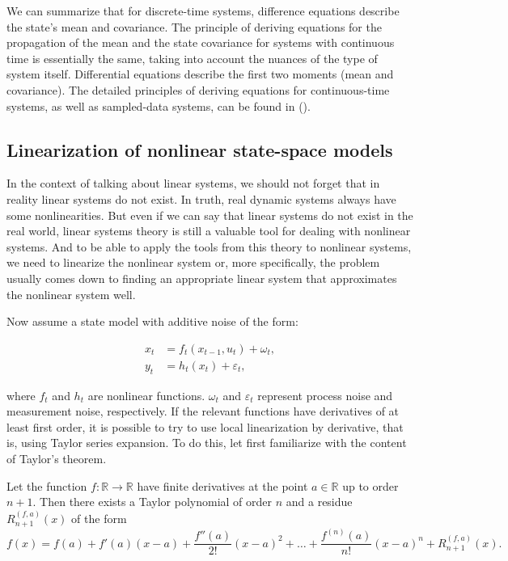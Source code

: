 We can summarize that for discrete-time systems, difference equations describe the state's mean and covariance. The principle of deriving equations for the propagation of the mean and the state covariance for systems with continuous time is essentially the same, taking into account the nuances of the type of system itself. Differential equations describe the first two moments (mean and covariance). The detailed principles of deriving equations for continuous-time systems, as well as sampled-data systems, can be found in (\cite[Chapter~4]{simon_optimal_2006}).

\subsection{Linearization of nonlinear state-space models} \label{lineariaztion_of_nonlinear_models}
In the context of talking about linear systems, we should not forget that in reality linear systems do not exist. In truth, real dynamic systems always have some nonlinearities. But even if we can say that linear systems do not exist in the real world, linear systems theory is still a valuable tool for dealing with nonlinear systems. And to be able to apply the tools from this theory to nonlinear systems, we need to linearize the nonlinear system or, more specifically, the problem usually comes down to finding an appropriate linear system that approximates the nonlinear system well.

Now assume a state model with additive noise of the form:

\begin{subequations}
\begin{align*}
x_t &= f_t(x_{t-1}, u_t) + \omega_t, \\
y_t &= h_t(x_t) + \varepsilon_t,
\end{align*}
\end{subequations}

\noindent where \(f_t\) and \(h_t\) are nonlinear functions. \(\omega_t\) and \(\varepsilon_t\) represent process noise and measurement noise, respectively. If the relevant functions have derivatives of at least first order, it is possible to try to use local linearization by derivative, that is, using Taylor series expansion. To do this, let first familiarize with the content of Taylor's theorem.

\begin{theorem}
Let the function \(f:\mathbb{R}\to\mathbb{R}\) have finite derivatives at the point \(a\in\mathbb{R}\) up to order \(n+1\). Then there exists a Taylor polynomial of order \(n\) and a residue \(R_{n+1}^{(f,a)}(x)\) of the form
\begin{equation*}
    f(x) = f(a) + f'(a)(x-a) + \frac{f''(a)}{2!}(x-a)^2 + \ldots + \frac{f^{(n)}(a)}{n!} (x-a)^n + R_{n+1}^{(f,a)}(x).
\end{equation*}
\end{theorem}

